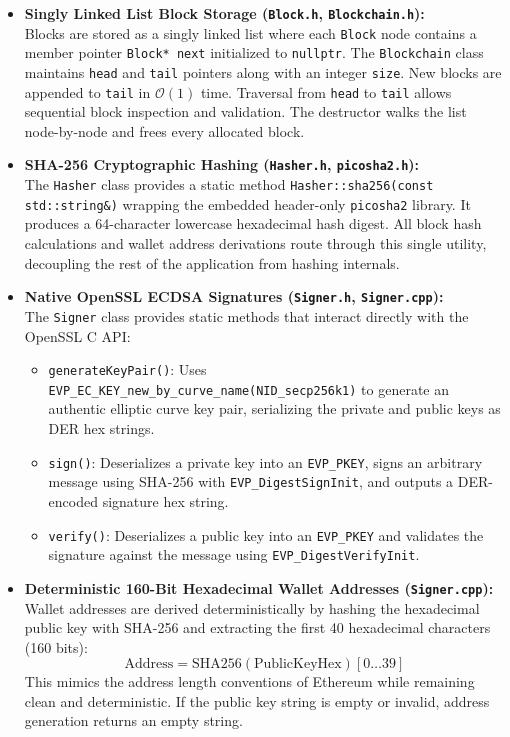 \documentclass[11pt,a4paper]{report}
\begin{document}
\begin{itemize}
    \item \textbf{Singly Linked List Block Storage (\texttt{Block.h}, \texttt{Blockchain.h}):}\\
    Blocks are stored as a singly linked list where each \texttt{Block} node contains a member pointer \texttt{Block* next} initialized to \texttt{nullptr}. The \texttt{Blockchain} class maintains \texttt{head} and \texttt{tail} pointers along with an integer \texttt{size}. New blocks are appended to \texttt{tail} in $\mathcal{O}(1)$ time. Traversal from \texttt{head} to \texttt{tail} allows sequential block inspection and validation. The destructor walks the list node-by-node and frees every allocated block.

    \item \textbf{SHA-256 Cryptographic Hashing (\texttt{Hasher.h}, \texttt{picosha2.h}):}\\
    The \texttt{Hasher} class provides a static method \texttt{Hasher::sha256(const std::string\&)} wrapping the embedded header-only \texttt{picosha2} library. It produces a 64-character lowercase hexadecimal hash digest. All block hash calculations and wallet address derivations route through this single utility, decoupling the rest of the application from hashing internals.

    \item \textbf{Native OpenSSL ECDSA Signatures (\texttt{Signer.h}, \texttt{Signer.cpp}):}\\
    The \texttt{Signer} class provides static methods that interact directly with the OpenSSL C API:
    \begin{itemize}
        \item \texttt{generateKeyPair()}: Uses \texttt{EVP\_EC\_KEY\_new\_by\_curve\_name(NID\_secp256k1)} to generate an authentic elliptic curve key pair, serializing the private and public keys as DER hex strings.
        \item \texttt{sign()}: Deserializes a private key into an \texttt{EVP\_PKEY}, signs an arbitrary message using SHA-256 with \texttt{EVP\_DigestSignInit}, and outputs a DER-encoded signature hex string.
        \item \texttt{verify()}: Deserializes a public key into an \texttt{EVP\_PKEY} and validates the signature against the message using \texttt{EVP\_DigestVerifyInit}.
    \end{itemize}

    \item \textbf{Deterministic 160-Bit Hexadecimal Wallet Addresses (\texttt{Signer.cpp}):}\\
    Wallet addresses are derived deterministically by hashing the hexadecimal public key with SHA-256 and extracting the first 40 hexadecimal characters (160 bits):
    \begin{equation}
        \text{Address} = \text{SHA256}(\text{PublicKeyHex})[0\dots 39]
    \end{equation}
    This mimics the address length conventions of Ethereum while remaining clean and deterministic. If the public key string is empty or invalid, address generation returns an empty string.


\end{itemize}
\end{document}
